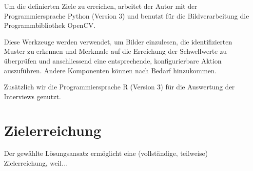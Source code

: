 Um die definierten Ziele zu erreichen, arbeitet der Autor mit der Programmiersprache Python (Version 3) und benutzt für die Bildverarbeitung die Programmbibliothek OpenCV.

Diese Werkzeuge werden verwendet, um Bilder einzulesen, die identifizierten Muster zu erkennen und Merkmale auf die Erreichung der Schwellwerte zu überprüfen und anschliessend eine entsprechende, konfigurierbare Aktion auszuführen. Andere Komponenten können nach Bedarf hinzukommen.

Zusätzlich wir die Programmiersprache R (Version 3) für die Auswertung der Interviews genutzt.

\section{Zielerreichung}

Der gewählte Lösungsansatz ermöglicht eine (vollständige, teilweise) Zielerreichung, weil... 


